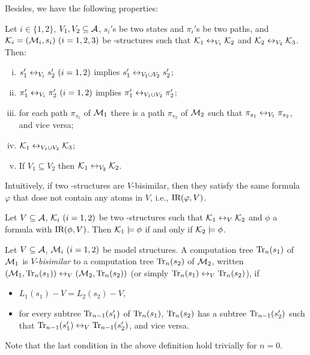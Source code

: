 \documentclass{article}
\begin{document}
Besides, we have the following properties:
\begin{proposition}\label{div}
Let $i\in \{1,2\}$, $V_1,V_2\subseteq\cal A$, $s_i'$s be two states and
  $\pi_i'$s be two paths,
and ${\cal K}_i=({\cal M}_i,s_i)~(i=1,2,3)$ be \MPK-structures
 such that
${\cal K}_1\leftrightarrow_{V_1}{\cal K}_2$ and ${\cal K}_2\leftrightarrow_{V_2}{\cal K}_3$.
 Then:
 \begin{enumerate}[(i)]
   \item $s_1'\leftrightarrow_{V_i}s_2'~(i=1,2)$ implies $s_1'\leftrightarrow_{V_1\cup V_2}s_2'$;
   \item $\pi_1'\leftrightarrow_{V_i}\pi_2'~(i=1,2)$ implies $\pi_1'\leftrightarrow_{V_1\cup V_2}\pi_2'$;
   \item for each path $\pi_{s_1}$ of ${\cal M}_1$ there is a path $\pi_{s_2}$  of ${\cal M}_2$ such that $\pi_{s_1} \leftrightarrow_{V_1} \pi_{s_2}$, and vice versa;
   \item ${\cal K}_1\leftrightarrow_{V_1\cup V_2}{\cal K}_3$;
   \item If $V_1 \subseteq V_2$ then ${\cal K}_1 \leftrightarrow_{V_2} {\cal K}_2$.
 \end{enumerate}
\end{proposition}








Intuitively, if two \MPK-structures are $V$-bisimilar, then they satisfy the same formula $\varphi$ that dose not contain any atoms in $V$, i.e., $\textrm{IR}(\varphi, V)$.
\begin{theorem}\label{thm:V-bisimulation:EQ}
  Let $V\subseteq\cal A$, ${\cal K}_i~(i=1,2)$ be two \MPK-structures such that
  ${\cal K}_1\leftrightarrow_V{\cal K}_2$ and $\phi$ a formula with $\textrm{IR}(\phi,V)$. Then
  ${\cal K}_1\models\phi$ if and only if ${\cal K}_2\models\phi$.
\end{theorem}


Let $V\subseteq\cal A$, ${\cal M}_i~(i=1,2)$ be  model structures.
A computation tree $\textrm{Tr}_n(s_1)$ of ${\cal M}_1$ is $V$-{\em bisimilar}
to a computation tree $\textrm{Tr}_n(s_2)$ of ${\cal M}_2$, written
$({\cal M}_1,\textrm{Tr}_n(s_1))\leftrightarrow_V({\cal M}_2,\textrm{Tr}_n(s_2))$ (or simply
$\textrm{Tr}_n(s_1)\leftrightarrow_V\textrm{Tr}_n(s_2)$), if %
\begin{itemize}
  \item $L_1(s_1)- V=L_2(s_2)- V$,
  \item for every subtree $\textrm{Tr}_{n-1}(s_1')$ of $\textrm{Tr}_n(s_1)$,
  $\textrm{Tr}_n(s_2)$ has a subtree $\textrm{Tr}_{n-1}(s_2')$ such that
  $\textrm{Tr}_{n-1}(s_1')\leftrightarrow_V\textrm{Tr}_{n-1}(s_2')$, and vice versa.
\end{itemize}
Note that the last condition in the above definition
hold trivially for $n=0$.
\end{document}
